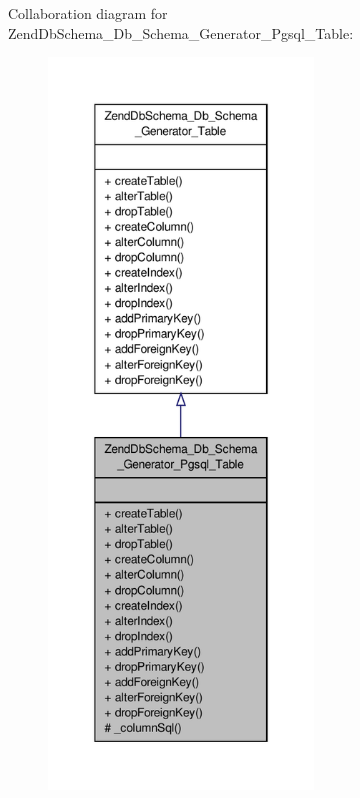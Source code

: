 Collaboration diagram for Zend\-Db\-Schema\-\_\-\-Db\-\_\-\-Schema\-\_\-\-Generator\-\_\-\-Pgsql\-\_\-\-Table\-:\nopagebreak
\begin{figure}[H]
\begin{center}
\leavevmode
\includegraphics[height=550pt]{classZendDbSchema__Db__Schema__Generator__Pgsql__Table__coll__graph}
\end{center}
\end{figure}
